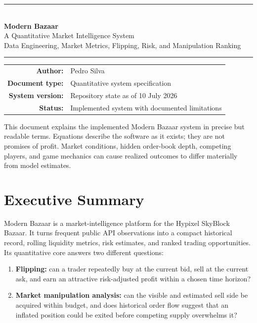 \documentclass[11pt,a4paper]{article}
\begin{document}

\begin{titlepage}
  \centering
  \vspace*{24mm}
  {\color{navy}\rule{\textwidth}{1.2pt}}\\[12mm]
  {\Huge\bfseries\color{navy} Modern Bazaar\\[4mm]}
  {\LARGE A Quantitative Market Intelligence System\\[4mm]}
  {\large Data Engineering, Market Metrics, Flipping, Risk, and Manipulation Ranking}
  \\[12mm]
  {\color{navy}\rule{\textwidth}{1.2pt}}
  \vfill
  \begin{tabular}{rl}
    \textbf{Author:} & Pedro Silva\\
    \textbf{Document type:} & Quantitative system specification\\
    \textbf{System version:} & Repository state as of 10 July 2026\\
    \textbf{Status:} & Implemented system with documented limitations
  \end{tabular}
  \vfill
  \begin{minipage}{0.86\textwidth}
  \small\color{textgray}
  This document explains the implemented Modern Bazaar system in precise but readable
  terms. Equations describe the software as it exists; they are not promises of profit.
  Market conditions, hidden order-book depth, competing players, and game mechanics can
  cause realized outcomes to differ materially from model estimates.
  \end{minipage}
\end{titlepage}

\tableofcontents
\clearpage
{}

\section{Executive Summary}

Modern Bazaar is a market-intelligence platform for the Hypixel SkyBlock Bazaar. It turns
frequent public API observations into a compact historical record, rolling liquidity
metrics, risk estimates, and ranked trading opportunities. Its quantitative core answers
two different questions:

\begin{enumerate}
  \item \textbf{Flipping:} can a trader repeatedly buy at the current bid, sell at the
  current ask, and earn an attractive risk-adjusted profit within a chosen time horizon?
  \item \textbf{Market manipulation analysis:} can the visible and estimated sell side be
  acquired within budget, and does historical order flow suggest that an inflated position
  could be exited before competing supply overwhelms it?
\end{enumerate}
\end{document}
